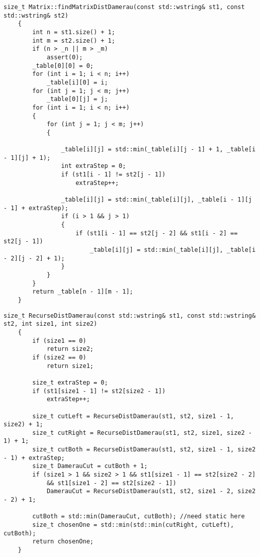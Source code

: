 \begin{lstlisting}[label=lst:damer_matr,caption=Метод нахождения расстояния Дамерау-Левенштейна с использованием матрицы]
    size_t Matrix::findMatrixDistDamerau(const std::wstring& st1, const std::wstring& st2)
    {
        int n = st1.size() + 1;
        int m = st2.size() + 1;
        if (n > _n || m > _m)
            assert(0);
        _table[0][0] = 0;
        for (int i = 1; i < n; i++)
            _table[i][0] = i;
        for (int j = 1; j < m; j++)
            _table[0][j] = j;
        for (int i = 1; i < n; i++)
        {
            for (int j = 1; j < m; j++)
            {
    
                _table[i][j] = std::min(_table[i][j - 1] + 1, _table[i - 1][j] + 1);
                int extraStep = 0;
                if (st1[i - 1] != st2[j - 1])
                    extraStep++;
    
                _table[i][j] = std::min(_table[i][j], _table[i - 1][j - 1] + extraStep);
                if (i > 1 && j > 1)
                {
                    if (st1[i - 1] == st2[j - 2] && st1[i - 2] == st2[j - 1])
                        _table[i][j] = std::min(_table[i][j], _table[i - 2][j - 2] + 1);
                }
            }
        }
        return _table[n - 1][m - 1];
    }
\end{lstlisting}

\begin{lstlisting}[label=lst:damer_rec,caption=Функция нахождения расстояния Дамерау-Левенштейна с использованием рекурсии]
    size_t RecurseDistDamerau(const std::wstring& st1, const std::wstring& st2, int size1, int size2)
    {
        if (size1 == 0)
            return size2;
        if (size2 == 0)
            return size1;
    
        size_t extraStep = 0;
        if (st1[size1 - 1] != st2[size2 - 1])
            extraStep++;
    
        size_t cutLeft = RecurseDistDamerau(st1, st2, size1 - 1, size2) + 1;
        size_t cutRight = RecurseDistDamerau(st1, st2, size1, size2 - 1) + 1;
        size_t cutBoth = RecurseDistDamerau(st1, st2, size1 - 1, size2 - 1) + extraStep;
        size_t DamerauCut = cutBoth + 1;
        if (size1 > 1 && size2 > 1 && st1[size1 - 1] == st2[size2 - 2]
            && st1[size1 - 2] == st2[size2 - 1])
            DamerauCut = RecurseDistDamerau(st1, st2, size1 - 2, size2 - 2) + 1;
    
        cutBoth = std::min(DamerauCut, cutBoth); //need static here
        size_t chosenOne = std::min(std::min(cutRight, cutLeft), cutBoth);
        return chosenOne;
    }
\end{lstlisting}

